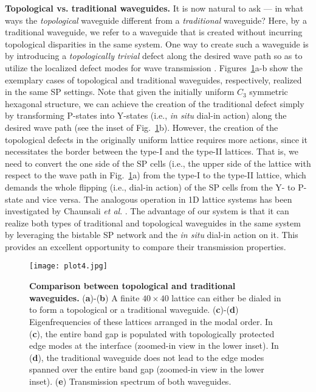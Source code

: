 \documentclass[aps,preprint,onecolumn,showpacs,superscriptaddress,groupedaddress]{revtex4}  %
\begin{document}
\textbf{Topological vs. traditional waveguides.} It is now natural to ask --- in what ways the \textit{topological} waveguide different from a \textit{traditional} waveguide? Here, by a traditional waveguide, we refer to a waveguide that is created without incurring topological disparities in the same system. %
One way to create such a waveguide is by introducing a \textit{topologically trivial} defect along the desired wave path so as to utilize the localized defect modes for wave transmission \citep{43}. Figures~\ref{fig4}a-b show the exemplary cases of topological and traditional waveguides, respectively, realized in the same SP settings. Note that given the initially uniform $C_3$ symmetric hexagonal structure, we can achieve the creation of the traditional defect simply by transforming P-states into Y-states (i.e., \textit{in situ} dial-in action) along the desired wave path (see the inset of Fig.~\ref{fig4}b). However, the creation of the topological defects in the originally uniform lattice requires more actions, since it necessitates the border between the type-I and the type-II lattices. That is, we need to convert the one side of the SP cells (i.e., the upper side of the lattice with respect to the wave path in Fig.~\ref{fig4}a) from the type-I to the type-II lattice, which demands the whole flipping (i.e., dial-in action) of the SP cells from the Y- to P-state and vice versa. The analogous operation in 1D lattice systems has been investigated by Chaunsali \textit{et al}. \citep{38}. The advantage of our system is that it can realize both types of traditional and topological waveguides in the same system by leveraging the bistable SP network and the \textit{in situ} dial-in action on it. This provides an excellent opportunity to compare their transmission properties. 

\begin{figure}[!]
\centering
\texttt{[image: plot4.jpg]}
\caption{\textbf{Comparison between topological and traditional waveguides.} (\textbf{a})-(\textbf{b}) A finite $40 \times 40$ lattice can either be dialed in to form a topological or a traditional waveguide. (\textbf{c})-(\textbf{d}) Eigenfrequencies of these lattices arranged in the modal order. In (\textbf{c}), the entire band gap is populated with topologically protected edge modes at the interface (zoomed-in view in the lower inset). In (\textbf{d}), the traditional waveguide does not lead to the edge modes spanned over the entire band gap (zoomed-in view in the lower inset). (\textbf{e}) Transmission spectrum of both waveguides.}
\label{fig4}
\end{figure} 
\end{document}
